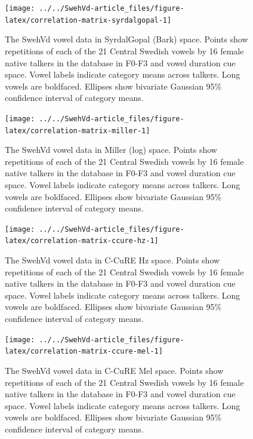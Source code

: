 \documentclass[utf8]{frontiers_suppmat} %
\begin{document}
\begin{figure}
\texttt{[image: ../../SwehVd-article\_files/figure-latex/correlation-matrix-syrdalgopal-1]} \caption{The SwehVd vowel data in SyrdalGopal (Bark) space. Points show repetitions of each of the 21 Central Swedish vowels by 16 female native talkers in the database in F0-F3 and vowel duration cue space. Vowel labels indicate category means across talkers. Long vowels are boldfaced. Ellipses show bivariate Gaussian 95\% confidence interval of category means.}\label{fig:correlation-matrix-syrdalgopal}
\end{figure}



\begin{figure}
\texttt{[image: ../../SwehVd-article\_files/figure-latex/correlation-matrix-miller-1]} \caption{The SwehVd vowel data in Miller (log) space. Points show repetitions of each of the 21 Central Swedish vowels by 16 female native talkers in the database in F0-F3 and vowel duration cue space. Vowel labels indicate category means across talkers. Long vowels are boldfaced. Ellipses show bivariate Gaussian 95\% confidence interval of category means.}\label{fig:correlation-matrix-miller}
\end{figure}



\begin{figure}
\texttt{[image: ../../SwehVd-article\_files/figure-latex/correlation-matrix-ccure-hz-1]} \caption{The SwehVd vowel data in C-CuRE Hz space. Points show repetitions of each of the 21 Central Swedish vowels by 16 female native talkers in the database in F0-F3 and vowel duration cue space. Vowel labels indicate category means across talkers. Long vowels are boldfaced. Ellipses show bivariate Gaussian 95\% confidence interval of category means.}\label{fig:correlation-matrix-ccure-hz}
\end{figure}



\begin{figure}
\texttt{[image: ../../SwehVd-article\_files/figure-latex/correlation-matrix-ccure-mel-1]} \caption{The SwehVd vowel data in C-CuRE Mel space. Points show repetitions of each of the 21 Central Swedish vowels by 16 female native talkers in the database in F0-F3 and vowel duration cue space. Vowel labels indicate category means across talkers. Long vowels are boldfaced. Ellipses show bivariate Gaussian 95\% confidence interval of category means.}\label{fig:correlation-matrix-ccure-mel}
\end{figure}
\end{document}

